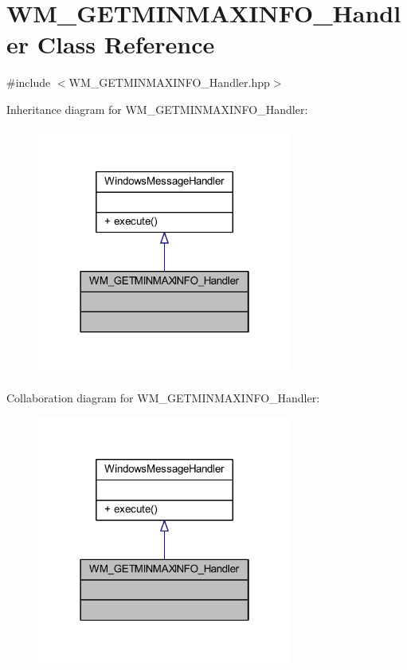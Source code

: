 \hypertarget{class_w_m___g_e_t_m_i_n_m_a_x_i_n_f_o___handler}{}\section{W\+M\+\_\+\+G\+E\+T\+M\+I\+N\+M\+A\+X\+I\+N\+F\+O\+\_\+\+Handler Class Reference}
\label{class_w_m___g_e_t_m_i_n_m_a_x_i_n_f_o___handler}


{\ttfamily \#include $<$W\+M\+\_\+\+G\+E\+T\+M\+I\+N\+M\+A\+X\+I\+N\+F\+O\+\_\+\+Handler.\+hpp$>$}



Inheritance diagram for W\+M\+\_\+\+G\+E\+T\+M\+I\+N\+M\+A\+X\+I\+N\+F\+O\+\_\+\+Handler\+:\nopagebreak
\begin{figure}[H]
\begin{center}
\leavevmode
\includegraphics[width=238pt]{class_w_m___g_e_t_m_i_n_m_a_x_i_n_f_o___handler__inherit__graph}
\end{center}
\end{figure}


Collaboration diagram for W\+M\+\_\+\+G\+E\+T\+M\+I\+N\+M\+A\+X\+I\+N\+F\+O\+\_\+\+Handler\+:\nopagebreak
\begin{figure}[H]
\begin{center}
\leavevmode
\includegraphics[width=238pt]{class_w_m___g_e_t_m_i_n_m_a_x_i_n_f_o___handler__coll__graph}
\end{center}
\end{figure}
